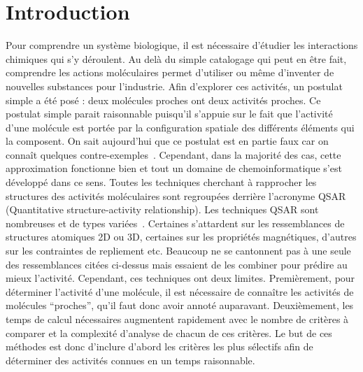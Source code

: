 

\section{Introduction}

Pour comprendre un système biologique, il est nécessaire d'étudier les interactions chimiques qui s'y déroulent.
Au delà du simple catalogage qui peut en être fait, comprendre les actions moléculaires permet d'utiliser ou même d'inventer de nouvelles substances pour l'industrie.
Afin d'explorer ces activités, un postulat simple a été posé : deux molécules proches ont deux activités proches.
Ce postulat simple parait raisonnable puisqu'il s'appuie sur le fait que l'activité d'une molécule est portée par la configuration spatiale des différents éléments qui la composent.
On sait aujourd'hui que ce postulat est en partie faux car on connaît quelques contre-exemples~\cite{patani_bioisosterism:_1996}.
Cependant, dans la majorité des cas, cette approximation fonctionne bien et tout un domaine de chemoinformatique s'est développé dans ce sens.
Toutes les techniques cherchant à rapprocher les structures des activités moléculaires sont regroupées derrière l'acronyme QSAR (Quantitative structure-activity relationship).
Les techniques QSAR sont nombreuses et de types variées~\cite{patani_bioisosterism:_1996,leach_molecular_2001,helma_predictive_2005}.
Certaines s'attardent sur les ressemblances de structures atomiques 2D ou 3D, certaines sur les propriétés magnétiques, d'autres sur les contraintes de repliement etc.
Beaucoup ne se cantonnent pas à une seule des ressemblances citées ci-dessus mais essaient de les combiner pour prédire au mieux l'activité.
Cependant, ces techniques ont deux limites.
Premièrement, pour déterminer l'activité d'une molécule, il est nécessaire de connaître les activités de molécules ``proches'', qu'il faut donc avoir annoté auparavant.
Deuxièmement, les temps de calcul nécessaires augmentent rapidement avec le nombre de critères à comparer et la complexité d'analyse de chacun de ces critères.
Le but de ces méthodes est donc d'inclure d'abord les critères les plus sélectifs afin de déterminer des activités connues en un temps raisonnable.

